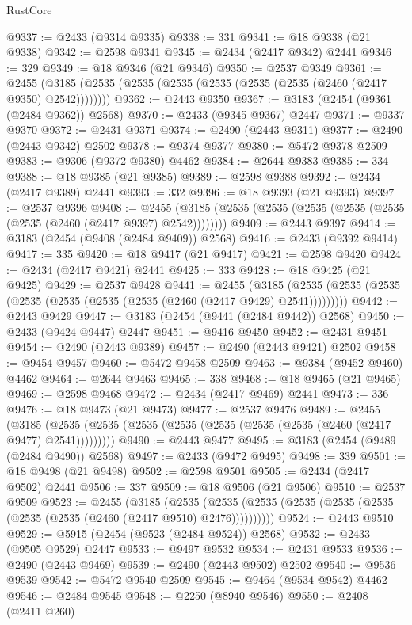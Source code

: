 \begin{lexlean}{RustCore}
\begin{coremodule}
@9337 := @2433 (@9314 @9335)
@9338 := 331
@9341 := @18 @9338 (@21 @9338)
@9342 := @2598 @9341
@9345 := @2434 (@2417 @9342) @2441
@9346 := 329
@9349 := @18 @9346 (@21 @9346)
@9350 := @2537 @9349
@9361 := @2455 (@3185 (@2535 (@2535 (@2535 (@2535 (@2535 (@2535 (@2460 (@2417 @9350) @2542))))))))
@9362 := @2443 @9350
@9367 := @3183 (@2454 (@9361 (@2484 @9362)) @2568)
@9370 := @2433 (@9345 @9367) @2447
@9371 := @9337 @9370
@9372 := @2431 @9371
@9374 := @2490 (@2443 @9311)
@9377 := @2490 (@2443 @9342) @2502
@9378 := @9374 @9377
@9380 := @5472 @9378 @2509
@9383 := @9306 (@9372 @9380) @4462
@9384 := @2644 @9383
@9385 := 334
@9388 := @18 @9385 (@21 @9385)
@9389 := @2598 @9388
@9392 := @2434 (@2417 @9389) @2441
@9393 := 332
@9396 := @18 @9393 (@21 @9393)
@9397 := @2537 @9396
@9408 := @2455 (@3185 (@2535 (@2535 (@2535 (@2535 (@2535 (@2535 (@2460 (@2417 @9397) @2542))))))))
@9409 := @2443 @9397
@9414 := @3183 (@2454 (@9408 (@2484 @9409)) @2568)
@9416 := @2433 (@9392 @9414)
@9417 := 335
@9420 := @18 @9417 (@21 @9417)
@9421 := @2598 @9420
@9424 := @2434 (@2417 @9421) @2441
@9425 := 333
@9428 := @18 @9425 (@21 @9425)
@9429 := @2537 @9428
@9441 := @2455
    (@3185 (@2535 (@2535 (@2535 (@2535 (@2535 (@2535 (@2535 (@2460 (@2417 @9429) @2541)))))))))
@9442 := @2443 @9429
@9447 := @3183 (@2454 (@9441 (@2484 @9442)) @2568)
@9450 := @2433 (@9424 @9447) @2447
@9451 := @9416 @9450
@9452 := @2431 @9451
@9454 := @2490 (@2443 @9389)
@9457 := @2490 (@2443 @9421) @2502
@9458 := @9454 @9457
@9460 := @5472 @9458 @2509
@9463 := @9384 (@9452 @9460) @4462
@9464 := @2644 @9463
@9465 := 338
@9468 := @18 @9465 (@21 @9465)
@9469 := @2598 @9468
@9472 := @2434 (@2417 @9469) @2441
@9473 := 336
@9476 := @18 @9473 (@21 @9473)
@9477 := @2537 @9476
@9489 := @2455
    (@3185 (@2535 (@2535 (@2535 (@2535 (@2535 (@2535 (@2535 (@2460 (@2417 @9477) @2541)))))))))
@9490 := @2443 @9477
@9495 := @3183 (@2454 (@9489 (@2484 @9490)) @2568)
@9497 := @2433 (@9472 @9495)
@9498 := 339
@9501 := @18 @9498 (@21 @9498)
@9502 := @2598 @9501
@9505 := @2434 (@2417 @9502) @2441
@9506 := 337
@9509 := @18 @9506 (@21 @9506)
@9510 := @2537 @9509
@9523 := @2455
    (@3185
      (@2535 (@2535 (@2535 (@2535 (@2535 (@2535 (@2535 (@2535 (@2460 (@2417 @9510) @2476))))))))))
@9524 := @2443 @9510
@9529 := @5915 (@2454 (@9523 (@2484 @9524)) @2568)
@9532 := @2433 (@9505 @9529) @2447
@9533 := @9497 @9532
@9534 := @2431 @9533
@9536 := @2490 (@2443 @9469)
@9539 := @2490 (@2443 @9502) @2502
@9540 := @9536 @9539
@9542 := @5472 @9540 @2509
@9545 := @9464 (@9534 @9542) @4462
@9546 := @2484 @9545
@9548 := @2250 (@8940 @9546)
@9550 := @2408 (@2411 @260)

\end{coremodule}
\end{lexlean}
